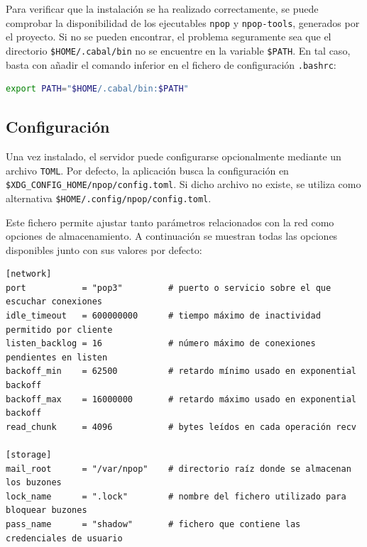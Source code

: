 \documentclass[a4paper]{CSMakotoTechnicalReport}
\begin{document}
Para verificar que la instalación se ha realizado correctamente, se puede comprobar la disponibilidad de los ejecutables \texttt{npop} y \texttt{npop-tools}, generados por el proyecto. Si no se pueden encontrar, el problema seguramente sea que el directorio \texttt{\$HOME/.cabal/bin} no se encuentre en la variable \texttt{\$PATH}. En tal caso, basta con añadir el comando inferior en el fichero de configuración \texttt{.bashrc}:

\vspace{-6pt}
\begin{minipage}{\linewidth}
\begin{lstlisting}[language=bash, numbers=none, basicstyle=\small]
export PATH="$HOME/.cabal/bin:$PATH"
\end{lstlisting}
\captionsetup{type=lstlisting}
\caption{Adición de ejecutables de \textit{cabal} al entorno del \textit{shell}.}
\end{minipage}
\vspace{4pt}


\subsection{Configuración}

Una vez instalado, el servidor puede configurarse opcionalmente mediante un archivo \texttt{TOML}. Por defecto, la aplicación busca la configuración en \texttt{\$XDG\_CONFIG\_HOME/npop/config.toml}. Si dicho archivo no existe, se utiliza como alternativa \texttt{\$HOME/.config/npop/config.toml}.

Este fichero permite ajustar tanto parámetros relacionados con la red como opciones de almacenamiento. A continuación se muestran todas las opciones disponibles junto con sus valores por defecto:

\vspace{-6pt}
\begin{minipage}{\linewidth}
\begin{lstlisting}[language={}, numbers=none, basicstyle=\small]
[network]
port           = "pop3"         # puerto o servicio sobre el que escuchar conexiones
idle_timeout   = 600000000      # tiempo máximo de inactividad permitido por cliente
listen_backlog = 16             # número máximo de conexiones pendientes en listen
backoff_min    = 62500          # retardo mínimo usado en exponential backoff
backoff_max    = 16000000       # retardo máximo usado en exponential backoff
read_chunk     = 4096           # bytes leídos en cada operación recv

[storage]
mail_root      = "/var/npop"    # directorio raíz donde se almacenan los buzones
lock_name      = ".lock"        # nombre del fichero utilizado para bloquear buzones
pass_name      = "shadow"       # fichero que contiene las credenciales de usuario
\end{lstlisting}
\captionsetup{type=lstlisting}
\caption{Parámetros configurables con el fichero config.toml.}
\end{minipage}
\end{document}
